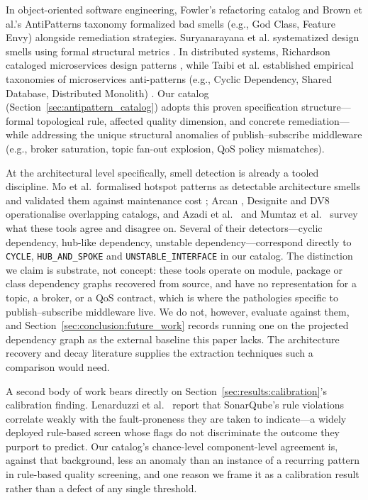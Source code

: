 In object-oriented software engineering, Fowler's refactoring catalog \citep{fowler1999refactoring} and Brown et al.'s AntiPatterns taxonomy \citep{brown1998antipatterns} formalized bad smells (e.g., God Class, Feature Envy) alongside remediation strategies. Suryanarayana et al. systematized design smells using formal structural metrics \citep{suryanarayana2014refactoring}. In distributed systems, Richardson cataloged microservices design patterns \citep{richardson2018microservices}, while Taibi et al. established empirical taxonomies of microservices anti-patterns (e.g., Cyclic Dependency, Shared Database, Distributed Monolith) \citep{taibi2020microservices}. Our catalog (Section~\ref{sec:antipattern_catalog}) adopts this proven specification structure---formal topological rule, affected quality dimension, and concrete remediation---while addressing the unique structural anomalies of publish--subscribe middleware (e.g., broker saturation, topic fan-out explosion, QoS policy mismatches).

At the architectural level specifically, smell detection is already a tooled discipline. Mo et al.\ formalised hotspot patterns as detectable architecture smells and validated them against maintenance cost \citep{mo2015hotspot}; Arcan \citep{arcan2017}, Designite \citep{sharma2016designite} and DV8 \citep{cai2019dv8} operationalise overlapping catalogs, and Azadi et al.\ \citep{azadi2019architectural} and Mumtaz et al.\ \citep{mumtaz2021systematic} survey what these tools agree and disagree on. Several of their detectors---cyclic dependency, hub-like dependency, unstable dependency---correspond directly to \texttt{CYCLE}, \texttt{HUB\_AND\_SPOKE} and \texttt{UNSTABLE\_INTERFACE} in our catalog. The distinction we claim is substrate, not concept: these tools operate on module, package or class dependency graphs recovered from source, and have no representation for a topic, a broker, or a QoS contract, which is where the pathologies specific to publish--subscribe middleware live. We do not, however, evaluate against them, and Section~\ref{sec:conclusion:future_work} records running one on the projected dependency graph as the external baseline this paper lacks. The architecture recovery and decay literature \citep{garcia2013comparative, le2015empirical} supplies the extraction techniques such a comparison would need.

A second body of work bears directly on Section~\ref{sec:results:calibration}'s calibration finding. Lenarduzzi et al.\ \citep{lenarduzzi2020sonarqube} report that SonarQube's rule violations correlate weakly with the fault-proneness they are taken to indicate---a widely deployed rule-based screen whose flags do not discriminate the outcome they purport to predict. Our catalog's chance-level component-level agreement is, against that background, less an anomaly than an instance of a recurring pattern in rule-based quality screening, and one reason we frame it as a calibration result rather than a defect of any single threshold.

